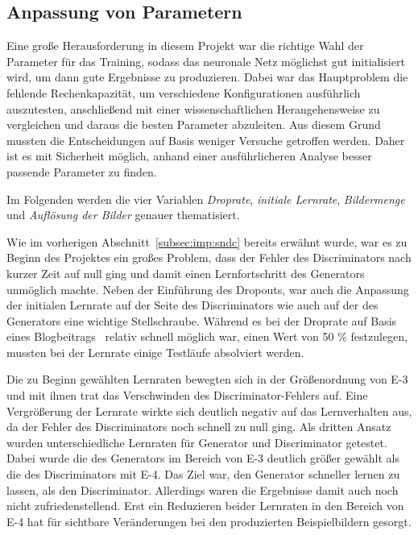  \subsection{Anpassung von Parametern} %
 
 Eine große Herausforderung in diesem Projekt war die richtige Wahl der Parameter für das Training, sodass das neuronale Netz möglichst gut initialisiert wird, um dann gute Ergebnisse zu produzieren. Dabei war das Hauptproblem die fehlende Rechenkapazität, um verschiedene Konfigurationen ausführlich auszutesten, anschließend mit einer wissenschaftlichen Herangehensweise zu vergleichen und daraus die besten Parameter abzuleiten. Aus diesem Grund mussten die Entscheidungen auf Basis weniger Versuche getroffen werden. Daher ist es mit Sicherheit möglich, anhand einer ausführlicheren Analyse besser passende Parameter zu finden.
 
 Im Folgenden werden die vier Variablen \emph{Droprate}, \emph{initiale Lernrate}, \emph{Bildermenge} und \emph{Auflösung der Bilder} genauer thematisiert.
 
 Wie im vorherigen Abschnitt~\ref{subsec:imp:sndc} bereits erwähnt wurde, war es zu Beginn des Projektes ein großes Problem, dass der Fehler des Discriminators nach kurzer Zeit auf null ging und damit einen Lernfortschritt des Generators unmöglich machte. Neben der Einführung des Dropouts, war auch die Anpassung der initialen Lernrate auf der Seite des Discriminators wie auch auf der des Generators eine wichtige Stellschraube. Während es bei der Droprate auf Basis eines Blogbeitrags~\cite{brownlee2019} relativ schnell möglich war, einen Wert von 50 \% festzulegen, mussten bei der Lernrate einige Testläufe absolviert werden. 
 
 Die zu Beginn gewählten Lernraten bewegten sich in der Größenordnung von E-3 und mit ihnen trat das Verschwinden des Discriminator-Fehlers auf. Eine Vergrößerung der Lernrate wirkte sich deutlich negativ auf das Lernverhalten aus, da der Fehler des Discriminators noch schnell zu null ging. Als dritten Ansatz wurden unterschiedliche Lernraten für Generator und Discriminator getestet. Dabei wurde die des Generators im Bereich von E-3 deutlich größer gewählt als die des Discriminators mit E-4. Das Ziel war, den Generator schneller lernen zu lassen, als den Discriminator. Allerdings waren die Ergebnisse damit auch noch nicht zufriedenstellend. Erst ein Reduzieren beider Lernraten in den Bereich von E-4 hat für sichtbare Veränderungen bei den produzierten Beispielbildern gesorgt.
 
